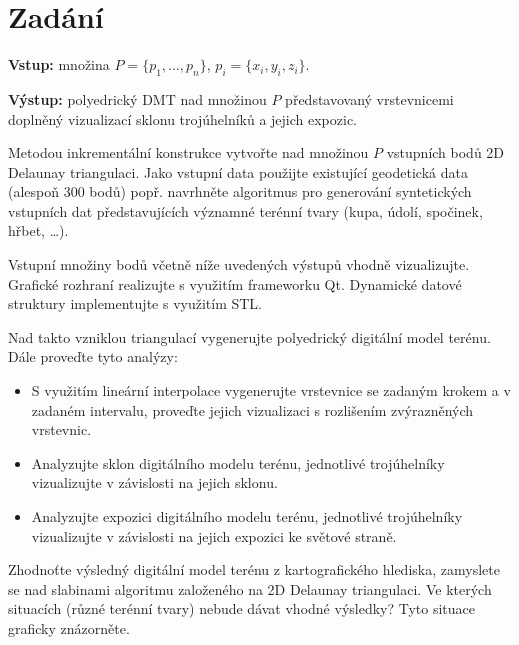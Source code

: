 \section{Zadání}
\textbf{Vstup:} množina $P = \{p_1, \dots, p_n\}$, $p_i = \{x_i, y_i, z_i\}$.

\textbf{Výstup:} polyedrický DMT nad množinou $P$ představovaný vrstevnicemi doplněný vizualizací sklonu trojúhelníků a jejich expozic.

\vspace{0.5em}

Metodou inkrementální konstrukce vytvořte nad množinou $P$ vstupních bodů 2D Delaunay triangulaci. Jako vstupní data použijte existující geodetická data (alespoň 300 bodů) popř. navrhněte algoritmus pro generování syntetických vstupních dat představujících významné terénní tvary (kupa, údolí, spočinek, hřbet, \dots).

Vstupní množiny bodů včetně níže uvedených výstupů vhodně vizualizujte. Grafické rozhraní realizujte s využitím frameworku Qt. Dynamické datové struktury implementujte s využitím STL.

\vspace{0.5em}

Nad takto vzniklou triangulací vygenerujte polyedrický digitální model terénu. Dále proveďte tyto analýzy:

\begin{itemize}
    \item S využitím lineární interpolace vygenerujte vrstevnice se zadaným krokem a v zadaném intervalu, proveďte jejich vizualizaci s rozlišením zvýrazněných vrstevnic.
    
    \item Analyzujte sklon digitálního modelu terénu, jednotlivé trojúhelníky vizualizujte v závislosti na jejich sklonu.
    
    \item Analyzujte expozici digitálního modelu terénu, jednotlivé trojúhelníky vizualizujte v závislosti na jejich expozici ke světové straně.
\end{itemize}

Zhodnoťte výsledný digitální model terénu z kartografického hlediska, zamyslete se nad slabinami algoritmu založeného na 2D Delaunay triangulaci. Ve kterých situacích (různé terénní tvary) nebude dávat vhodné výsledky? Tyto situace graficky znázorněte.


